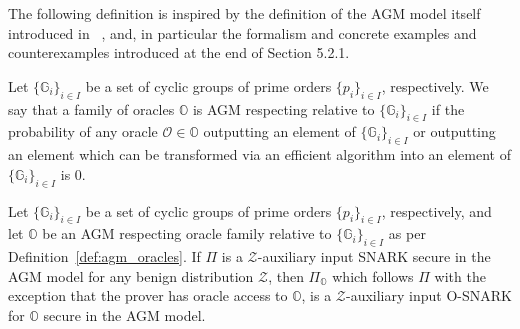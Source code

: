 \noindent The following definition is inspired by the definition of the AGM model itself introduced in ~\cite{DBLP:phd/dnb/Loss19}, and, in particular the formalism and 
concrete examples and counterexamples introduced at the end of Section 5.2.1.  

\begin{definition}
\label{def:agm_oracles}
Let $\{\mathbb{G}_{i}\}_{i  \in I}$ be a set of cyclic groups of prime orders $\{p_i\}_{i \in I}$, respectively. 
We say that a family of oracles $\mathbb{O}$ is AGM respecting relative to 
$\{\mathbb{G}_{i}\}_{i  \in I}$ if the probability of any oracle $\mathcal{O} \in \mathbb{O}$ outputting an element of 
$\{\mathbb{G}_{i}\}_{i  \in I}$ or outputting an element which can be transformed via an efficient algorithm into an element 
of $\{\mathbb{G}_{i}\}_{i  \in I}$ is $0$. 
\end{definition}

\begin{comment}
\begin{theorem}[O-SNARKS for AGM Respecting Oracles]
\label{the:when_osnarks} 
Let $\mathbb{G}$ be a cyclic group of prime order $p$ and let $\mathbb{O}$ be an AGM respecting oracle 
relative to $\mathbb{G}$ as per Definition~\ref{def:agm_oracles}. We denote by $\mathcal{Z}_{\mathbb{O}}$ the 
probability distribution of all the public parameters that define a member of $\mathbb{O}$ together with some 
polynomial number $Q$ of queries and answers to $\mathbb{O}$. More formally: 
$\mathcal{Z}_{\mathbb{O}} = (\mathit{pp}, \{\mathcal{O}(q_i), q_i\}_{i=1}^Q)$, 
$Q = \mathsf{poly}(\lambda)$, $(\mathit{pp}, \mathcal{O}) \leftarrow \mathbb{O}$. Then every $\mathcal{Z}_{\mathbb{O}}$-auxiliary 
input SNARK $\Pi$ secure in the AGM model with respect to $\mathbb{G}$ is an O-SNARK for $\mathbb{O}$.
\end{theorem}
\end{comment}

\begin{theorem}
\label{the:when_osnarks} 
Let $\{\mathbb{G}_{i}\}_{i  \in I}$ be a set of cyclic groups of prime orders $\{p_i\}_{i \in I}$, respectively, and let $\mathbb{O}$ be an AGM 
respecting oracle family relative to $\{\mathbb{G}_{i}\}_{i  \in I}$ as per Definition~\ref{def:agm_oracles}. 
If $\Pi$ is a $\mathcal{Z}$-auxiliary input SNARK secure in the AGM model for any benign 
distribution $\mathcal{Z}$, then $\Pi_{\mathbb{O}}$ which follows $\Pi$ with the exception that the prover has oracle access to $\mathbb{O}$, 
is a $\mathcal{Z}$-auxiliary input O-SNARK for $\mathbb{O}$ secure in the AGM model.
\end{theorem}


